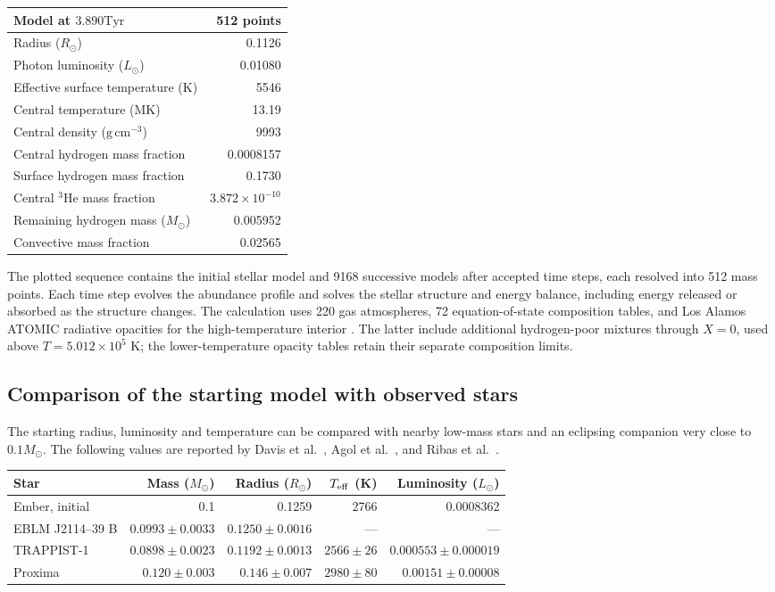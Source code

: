 \documentclass[11pt,letterpaper]{article}
\newcommand{\Ms}{M_\odot}\newcommand{\Rs}{R_\odot}\newcommand{\Ls}{L_\odot}
\newcommand{\Tyr}{\mathrm{Tyr}}
\begin{document}
\begin{center}\begin{tabular}{@{}lr@{}}\toprule
Model at $3.890\Tyr$ & 512 points \\\midrule
Radius ($\Rs$) & 0.1126 \\
Photon luminosity ($\Ls$) & 0.01080 \\
Effective surface temperature (K) & 5546 \\
Central temperature (MK) & 13.19 \\
Central density ($\mathrm{g\,cm^{-3}}$) & 9993 \\
Central hydrogen mass fraction & 0.0008157 \\
Surface hydrogen mass fraction & 0.1730 \\
Central $^3$He mass fraction & $3.872\times10^{-10}$ \\
Remaining hydrogen mass ($\Ms$) & 0.005952 \\
Convective mass fraction & 0.02565 \\\bottomrule
\end{tabular}\end{center}

The plotted sequence contains the initial stellar model and 9168 successive
models after accepted time steps, each resolved into 512 mass points. Each time
step evolves the abundance profile and solves the stellar structure and energy
balance, including energy released or absorbed as the structure changes.
The calculation uses 220 gas atmospheres, 72 equation-of-state composition
tables, and Los Alamos ATOMIC radiative opacities for the
high-temperature interior \cite{colgan16,tops}. The latter include additional
hydrogen-poor mixtures through $X=0$, used above $T=5.012\times10^5$ K;
the lower-temperature opacity tables retain their separate composition limits.

\subsection{Comparison of the starting model with observed stars}
The starting radius, luminosity and temperature can be compared with nearby
low-mass stars and an eclipsing companion very close to $0.1\Ms$.
The following values are reported by Davis et al.\ \cite{davis24}, Agol
et al.\ \cite{agol21}, and Ribas et al.\ \cite{ribas17}.

\begin{center}\small\begin{tabular}{@{}lrrrr@{}}\toprule
Star & Mass ($\Ms$) & Radius ($\Rs$) & $T_{\rm eff}$ (K) & Luminosity ($\Ls$) \\\midrule
Ember, initial & 0.1 & 0.1259 & 2766 & 0.0008362 \\
EBLM J2114--39 B & $0.0993\pm0.0033$ & $0.1250\pm0.0016$ & --- & --- \\
TRAPPIST-1 & $0.0898\pm0.0023$ & $0.1192\pm0.0013$ & $2566\pm26$ & $0.000553\pm0.000019$ \\
Proxima & $0.120\pm0.003$ & $0.146\pm0.007$ & $2980\pm80$ & $0.00151\pm0.00008$ \\\bottomrule
\end{tabular}\end{center}
\end{document}
